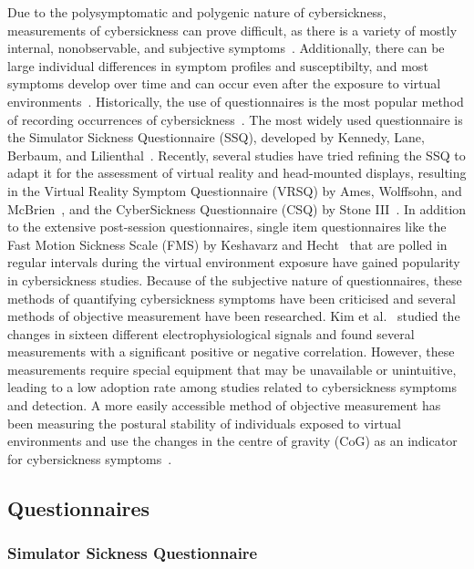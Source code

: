Due to the polysymptomatic and polygenic nature of cybersickness, measurements of cybersickness can prove
difficult, as there is a variety of mostly internal, nonobservable, and subjective symptoms~\cite{McCauley1992}.
Additionally, there can be large individual differences in symptom profiles and susceptibilty, and most symptoms
develop over time and can occur even after the exposure to virtual environments~\cite{McCauley1992}.
Historically, the use of questionnaires is the most popular method of recording occurrences of
cybersickness~\cite{Rebenitsch2016,Saredakis2020}.
The most widely used questionnaire is the Simulator Sickness Questionnaire (SSQ), developed by Kennedy, Lane, Berbaum,
and Lilienthal~\cite{Kennedy1993}.
Recently, several studies have tried refining the SSQ to adapt it for the assessment of virtual reality and
head-mounted displays, resulting in the Virtual Reality Symptom Questionnaire (VRSQ) by Ames, Wolffsohn, and
McBrien~\cite{Ames2005}, and the CyberSickness Questionnaire (CSQ) by Stone III~\cite{Stone2017}.
In addition to the extensive post-session questionnaires, single item questionnaires like the Fast Motion Sickness
Scale (FMS) by Keshavarz and Hecht~\cite{Keshavarz2011} that are polled in regular intervals during the virtual
environment exposure have gained popularity in cybersickness studies.
Because of the subjective nature of questionnaires, these methods of quantifying cybersickness symptoms have been
criticised and several methods of objective measurement have been researched.
Kim et al.~\cite{Kim2005} studied the changes in sixteen different electrophysiological signals and found several
measurements with a significant positive or negative correlation.
However, these measurements require special equipment that may be unavailable or unintuitive, leading to a low
adoption rate among studies related to cybersickness symptoms and detection.
A more easily accessible method of objective measurement has been measuring the postural stability of individuals
exposed to virtual environments and use the changes in the centre of gravity (CoG) as an indicator for cybersickness
symptoms~\cite{Lim2020}.


\subsection{Questionnaires}\label{subsec:questionnaires}

\subsubsection{Simulator Sickness Questionnaire}\label{subsubsec:simulator-sickness-questionnaire}

